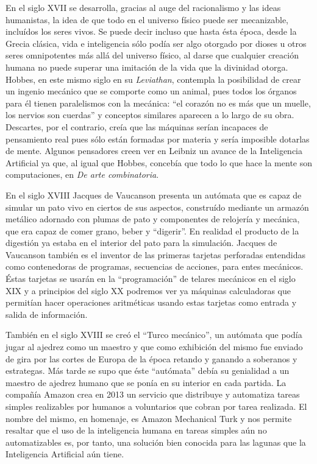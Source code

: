 \documentclass[12pt]{memoir}
\begin{document}
En el siglo XVII se desarrolla, gracias al auge del racionalismo y las ideas humanistas, la idea de que todo en el universo físico puede ser mecanizable, incluídos los seres vivos. Se puede decir incluso que hasta ésta época, desde la Grecia clásica, vida e inteligencia sólo podía ser algo otorgado por dioses u otros seres omnipotentes más allá del universo físico, al darse que cualquier creación humana no puede superar una imitación de la vida que la divinidad otorga. Hobbes, en este mismo siglo en su \textit{Leviathan}, contempla la posibilidad de crear un ingenio mecánico que se comporte como un animal, pues todos los órganos para él tienen paralelismos con la mecánica: ``el corazón no es más que un muelle, los nervios son cuerdas'' y conceptos similares aparecen a lo largo de su obra. Descartes, por el contrario, creía que las máquinas serían incapaces de pensamiento real pues sólo están formadas por materia y sería imposible dotarlas de mente. Algunos pensadores creen ver en Leibniz un avance de la Inteligencia Artificial ya que, al igual que Hobbes, concebía que todo lo que hace la mente son computaciones, en \textit{De arte combinatoria}. 

En el siglo XVIII Jacques de Vaucanson presenta un autómata que es capaz de simular un pato vivo en ciertos de sus aspectos, construído mediante un armazón metálico adornado con plumas de pato y componentes de relojería y mecánica, que era capaz de comer grano, beber y ``digerir''. En realidad el producto de la digestión ya estaba en el interior del pato para la simulación. Jacques de Vaucanson también es el inventor de las primeras tarjetas perforadas entendidas como contenedoras de programas, secuencias de acciones, para entes mecánicos. Éstas tarjetas se usarán en la ``programación'' de telares mecánicos en el siglo XIX y a principios del siglo XX podremos ver ya máquinas calculadoras que permitían hacer operaciones aritméticas usando estas tarjetas como entrada y salida de información.

También en el siglo XVIII se creó el ``Turco mecánico'', un autómata que podía jugar al ajedrez como un maestro y que como exhibición del mismo fue enviado de gira por las cortes de Europa de la época retando y ganando a soberanos y estrategas. Más tarde se supo que éste ``autómata'' debía su genialidad a un maestro de ajedrez humano que se ponía en su interior en cada partida. La compañía Amazon crea en 2013 un servicio que distribuye y automatiza tareas simples realizables por humanos a voluntarios que cobran por tarea realizada. El nombre del mismo, en homenaje, es Amazon Mechanical Turk y nos permite resaltar que el uso de la inteligencia humana en tareas simples aún no automatizables es, por tanto, una solución bien conocida para las lagunas que la Inteligencia Artificial aún tiene. 
\end{document}
